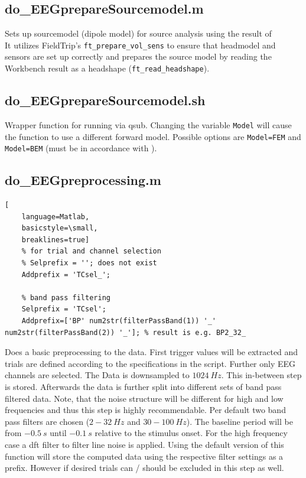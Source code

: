 \documentclass[12pt,a4paper]{scrartcl}
\begin{document}
\subsection{do\_EEGprepareSourcemodel.m}
\label{m:prepSM}
Sets up sourcemodel (dipole model) for source analysis using the result of \texttt{}\\
\noindent It utilizes FieldTrip's \texttt{ft\_prepare\_vol\_sens} to ensure that headmodel and sensors are set up correctly and prepares the source model by reading the Workbench result as a headshape (\texttt{ft\_read\_headshape}).\\

\subsection{do\_EEGprepareSourcemodel.sh}
\label{sh:prepSM}
Wrapper function for running \texttt{} via qsub. Changing the variable \texttt{Model} will cause the function to use a different forward model. Possible options are \texttt{Model=FEM} and \texttt{Model=BEM} (must be in accordance with \texttt{}).\\

\subsection{do\_EEGpreprocessing.m}
\label{m:EEGpreproc}
\begin{lstlisting}[
    language=Matlab,
    basicstyle=\small,
    breaklines=true]
    % for trial and channel selection
    % Selprefix = ''; does not exist
    Addprefix = 'TCsel_';

    % band pass filtering
    Selprefix = 'TCsel';
    Addprefix=['BP' num2str(filterPassBand(1)) '_' num2str(filterPassBand(2)) '_']; % result is e.g. BP2_32_
\end{lstlisting}
Does a basic preprocessing to the data. First trigger values will be extracted and trials are defined according to the specifications in the script. Further only EEG channels are selected. The Data is downsampled to $1024~Hz$. This in-between step is stored. Afterwards the data is further split into different sets of band pass filtered data. Note, that the noise structure will be different for high and low frequencies and thus this step is highly recommendable. Per default two band pass filters are chosen ($2-32~Hz$ and $30-100~Hz$). The baseline period will be from $-0.5~s$ until $-0.1~s$ relative to the stimulus onset. For the high frequency case a dft filter to filter line noise is applied. Using the default version of this function will store the computed data using the respective filter settings as a prefix. However if desired trials can / should be excluded in this step as well.\\
\end{document}

